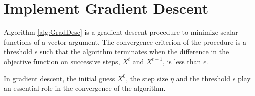 \documentclass{article}
\begin{document}
 


\section{Implement Gradient Descent}

Algorithm \ref{alg:GradDesc} is a gradient descent procedure to minimize scalar functions of a vector argument. The convergence criterion of the procedure is a threshold $\epsilon$ such that the algorithm terminates when the difference in the objective function on successive steps, $X^t$ and $X^{t+1}$, is less than $\epsilon$.

In gradient descent, the initial guess $X^0$, the step size $\eta$ and the threshold $\epsilon$ play an essential role in the convergence of the algorithm.

\begin{table}[t]
\caption{Number of iterations for convergence and final value of the objective function for different values of the step, threshold and initial guess.}
\label{GradInitialCond}
\begin{center}
\begin{small}
\begin{sc}
\end{sc}
\end{small}
\end{center}
\vskip -0.1in
\end{table}
\end{document}
